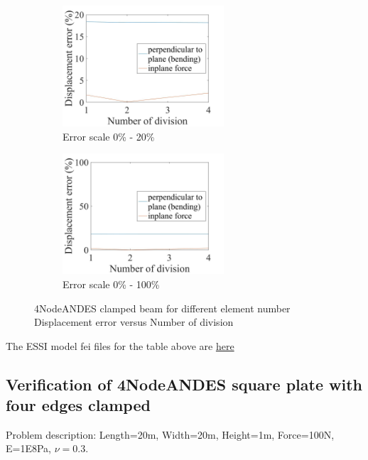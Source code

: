 \documentclass[fleqn,11pt]{article}
\begin{document}
\begin{figure}[H]
  \begin{subfigure}{0.5\textwidth}
    \centering
    \includegraphics[width=6cm]{../Figure-files/error4andes_clamped_beam_diff_element.jpeg}
    \caption{Error scale 0\% - 20\%}
  \end{subfigure}
  \begin{subfigure}{0.5\textwidth}
    \centering
    \includegraphics[width=6cm]{../Figure-files/error4andes_clamped_beam_diff_element100.jpeg}
    \caption{Error scale 0\% - 100\%}
  \end{subfigure}
  \captionsetup{justification=centering,margin=2cm}
  \caption{4NodeANDES clamped beam for different element number\\
      Displacement error   versus   Number of division}
  \label{fig error 4NodeANDES clamped beam for different element number}
\end{figure}


The ESSI model fei files for the table above are \href{https://github.com/yuan-energy/ESSI_Verification/blob/master/4NodeANDES/clamped_beam_cut/clamped_beam_cut.tar.gz?raw=true}{here}







\newpage
\subsection{Verification of 4NodeANDES square plate with four edges clamped}

Problem description: Length=20m, Width=20m, Height=1m, Force=100N, E=1E8Pa, $\nu=0.3$. 
\end{document}
